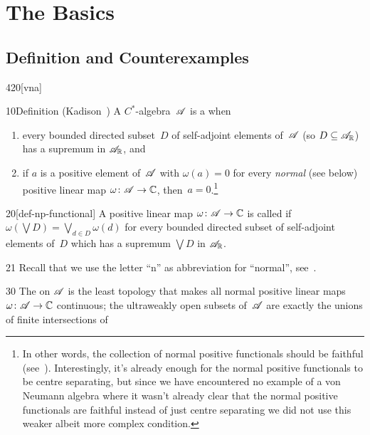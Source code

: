 \section{The Basics}
\subsection{Definition and Counterexamples}
\begin{parsec}{420}[vna]%
\begin{point}{10}{Definition (Kadison~\cite{kadison1956})}%
A $C^*$-algebra~$\mathscr{A}$
is a %
when
\begin{enumerate}
\item
every bounded directed subset~$D$
of self-adjoint elements of~$\mathscr{A}$ (so $D\subseteq \mathscr{A}_{\mathbb{R}}$) 
    has a supremum %
    in $\mathscr{A}_{\mathbb{R}}$, and
\item
if $a$ is a positive element of~$\mathscr{A}$
with $\omega(a)=0$ for every \emph{normal} (see below) positive 
linear map $\omega\colon \mathscr{A}\to \mathbb{C}$,
then~$a=0$.\footnote{In other words,
the collection of normal positive functionals should be faithful
(see~).
Interestingly,
it's already enough for the normal positive 
functionals to be centre separating,
but since we have encountered no example
of a von Neumann algebra
where it wasn't already clear that the normal positive 
functionals are faithful
instead of just centre separating
we did not use this weaker albeit more complex condition.}
\end{enumerate}
\begin{point}{20}[def-np-functional]
A positive linear map $\omega\colon \mathscr{A}\to \mathbb{C}$
is called %
if $\omega(\bigvee D) = \bigvee_{d\in D} \omega(d)$
for every bounded directed subset of self-adjoint elements of~$D$
which has a supremum $\bigvee D$ in $\mathscr{A}_{\mathbb{R}}$.
\begin{point}{21}
Recall that we use the letter ``n'' as abbreviation
for ``normal'', see~.
\end{point}
\end{point}%
\begin{point}{30}%
The 
on $\mathscr{A}$
is the least topology
that makes all normal positive linear maps $\omega\colon \mathscr{A}\to \mathbb{C}$
continuous; the ultraweakly open subsets of~$\mathscr{A}$
are exactly the unions
of finite intersections of

\end{point}
\end{point}
\end{parsec}
